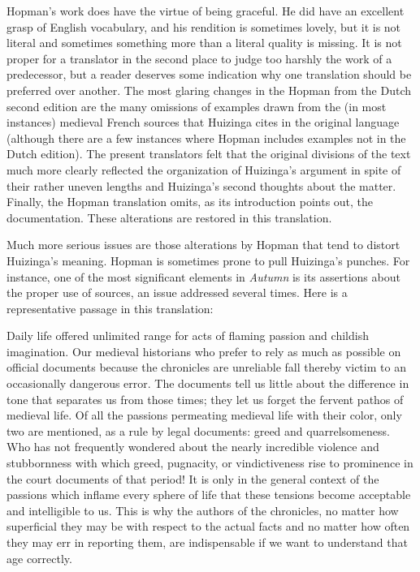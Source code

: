 Hopman's work does have the virtue of being graceful. He did have an
excellent grasp of English vocabulary, and his rendition is sometimes
lovely, but it is not literal and sometimes something more than a
literal quality is missing. It is not proper for a translator in the
second place to judge too harshly the work of a predecessor, but a
reader deserves some indication why one translation should be preferred
over another. The most glaring changes in the Hopman from the Dutch
second edition are the many omissions of
\protect\hypertarget{05_TRANSLATOR_S_INTRODUCTION.xhtmlux5cux23page_xiv}{}{}examples
drawn from the (in most instances) medieval French sources that Huizinga
cites in the original language (although there are a few instances where
Hopman includes examples not in the Dutch edition). The present
translators felt that the original divisions of the text much more
clearly reflected the organization of Huizinga's argument in spite of
their rather uneven lengths and Huizinga's second thoughts about the
matter. Finally, the Hopman translation omits, as its introduction
points out, the documentation. These alterations are restored in this
translation.

Much more serious issues are those alterations by Hopman that tend to
distort Huizinga's meaning. Hopman is sometimes prone to pull Huizinga's
punches. For instance, one of the most significant elements in
\emph{Autumn} is its assertions about the proper use of sources, an
issue addressed several times. Here is a representative passage in this
translation:

Daily life offered unlimited range for acts of flaming passion and
childish imagination. Our medieval historians who prefer to rely as much
as possible on official documents because the chronicles are unreliable
fall thereby victim to an occasionally dangerous error. The documents
tell us little about the difference in tone that separates us from those
times; they let us forget the fervent pathos of medieval life. Of all
the passions permeating medieval life with their color, only two are
mentioned, as a rule by legal documents: greed and quarrelsomeness. Who
has not frequently wondered about the nearly incredible violence and
stubbornness with which greed, pugnacity, or vindictiveness rise to
prominence in the court documents of that period! It is only in the
general context of the passions which inflame every sphere of life that
these tensions become acceptable and intelligible to us. This is why the
authors of the chronicles, no matter how superficial they may be with
respect to the actual facts and no matter how often they may err in
reporting them, are indispensable if we want to understand that age
correctly.

